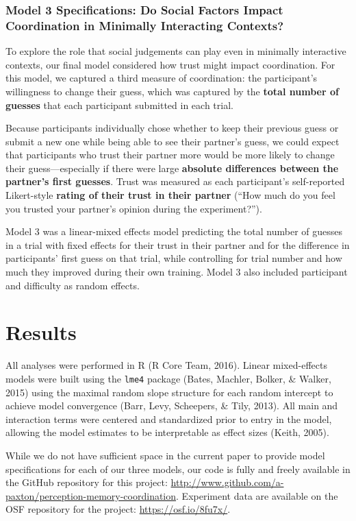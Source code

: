 \documentclass[10pt, letterpaper]{article}
\begin{document}
\subsubsection{Model 3 Specifications: Do Social Factors Impact
Coordination in Minimally Interacting
Contexts?}\label{model-3-specifications-do-social-factors-impact-coordination-in-minimally-interacting-contexts}

To explore the role that social judgements can play even in minimally
interactive contexts, our final model considered how trust might impact
coordination. For this model, we captured a third measure of
coordination: the participant's willingness to change their guess, which
was captured by the \textbf{total number of guesses} that each
participant submitted in each trial.

Because participants individually chose whether to keep their previous
guess or submit a new one while being able to see their partner's guess,
we could expect that participants who trust their partner more would be
more likely to change their guess---especially if there were large
\textbf{absolute differences between the partner's first guesses}. Trust
was measured as each participant's self-reported Likert-style
\textbf{rating of their trust in their partner} (``How much do you feel
you trusted your partner's opinion during the experiment?'').

Model 3 was a linear-mixed effects model predicting the total number of
guesses in a trial with fixed effects for their trust in their partner
and for the difference in participants' first guess on that trial, while
controlling for trial number and how much they improved during their own
training. Model 3 also included participant and difficulty as random
effects.

\section{Results}\label{results}

All analyses were performed in R (R Core Team, 2016). Linear
mixed-effects models were built using the \texttt{lme4} package (Bates,
Machler, Bolker, \& Walker, 2015) using the maximal random slope
structure for each random intercept to achieve model convergence (Barr,
Levy, Scheepers, \& Tily, 2013). All main and interaction terms were
centered and standardized prior to entry in the model, allowing the
model estimates to be interpretable as effect sizes (Keith, 2005).

While we do not have sufficient space in the current paper to provide
model specifications for each of our three models, our code is fully and
freely available in the GitHub repository for this project:
\url{http://www.github.com/a-paxton/perception-memory-coordination}.
Experiment data are available on the OSF repository for the project:
\url{https://osf.io/8fu7x/}.
\end{document}
